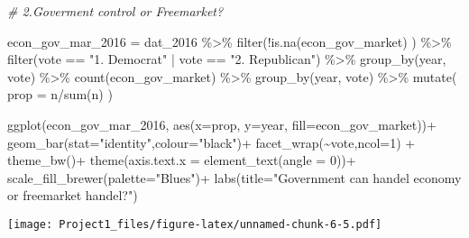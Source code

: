 \documentclass[
]{article}
\newenvironment{Shaded}{\begin{snugshade}}{\end{snugshade}}
\newcommand{\AttributeTok}[1]{\textcolor[rgb]{0.77,0.63,0.00}{#1}}
\newcommand{\CommentTok}[1]{\textcolor[rgb]{0.56,0.35,0.01}{\textit{#1}}}
\newcommand{\DecValTok}[1]{\textcolor[rgb]{0.00,0.00,0.81}{#1}}
\newcommand{\FunctionTok}[1]{\textcolor[rgb]{0.00,0.00,0.00}{#1}}
\newcommand{\NormalTok}[1]{#1}
\newcommand{\OtherTok}[1]{\textcolor[rgb]{0.56,0.35,0.01}{#1}}
\newcommand{\SpecialCharTok}[1]{\textcolor[rgb]{0.00,0.00,0.00}{#1}}
\newcommand{\StringTok}[1]{\textcolor[rgb]{0.31,0.60,0.02}{#1}}
\begin{document}
\begin{Shaded}
\begin{Highlighting}[]
\CommentTok{\# 2.Goverment control or Freemarket?}

\NormalTok{econ\_gov\_mar\_2016 }\OtherTok{=}\NormalTok{ dat\_2016 }\SpecialCharTok{\%\textgreater{}\%}
  \FunctionTok{filter}\NormalTok{(}\SpecialCharTok{!}\FunctionTok{is.na}\NormalTok{(econ\_gov\_market) ) }\SpecialCharTok{\%\textgreater{}\%}
  \FunctionTok{filter}\NormalTok{(vote }\SpecialCharTok{==} \StringTok{"1. Democrat"} \SpecialCharTok{|}\NormalTok{ vote }\SpecialCharTok{==} \StringTok{"2. Republican"}\NormalTok{) }\SpecialCharTok{\%\textgreater{}\%}
  \FunctionTok{group\_by}\NormalTok{(year, vote) }\SpecialCharTok{\%\textgreater{}\%}
  \FunctionTok{count}\NormalTok{(econ\_gov\_market) }\SpecialCharTok{\%\textgreater{}\%}
  \FunctionTok{group\_by}\NormalTok{(year, vote) }\SpecialCharTok{\%\textgreater{}\%}
  \FunctionTok{mutate}\NormalTok{(}
    \AttributeTok{prop =}\NormalTok{ n}\SpecialCharTok{/}\FunctionTok{sum}\NormalTok{(n)}
\NormalTok{  )}

\FunctionTok{ggplot}\NormalTok{(econ\_gov\_mar\_2016,}
       \FunctionTok{aes}\NormalTok{(}\AttributeTok{x=}\NormalTok{prop, }\AttributeTok{y=}\NormalTok{year, }\AttributeTok{fill=}\NormalTok{econ\_gov\_market))}\SpecialCharTok{+}
  \FunctionTok{geom\_bar}\NormalTok{(}\AttributeTok{stat=}\StringTok{"identity"}\NormalTok{,}\AttributeTok{colour=}\StringTok{"black"}\NormalTok{)}\SpecialCharTok{+}
  \FunctionTok{facet\_wrap}\NormalTok{(}\SpecialCharTok{\textasciitilde{}}\NormalTok{vote,}\AttributeTok{ncol=}\DecValTok{1}\NormalTok{) }\SpecialCharTok{+}
  \FunctionTok{theme\_bw}\NormalTok{()}\SpecialCharTok{+}
  \FunctionTok{theme}\NormalTok{(}\AttributeTok{axis.text.x =} \FunctionTok{element\_text}\NormalTok{(}\AttributeTok{angle =} \DecValTok{0}\NormalTok{))}\SpecialCharTok{+}
  \FunctionTok{scale\_fill\_brewer}\NormalTok{(}\AttributeTok{palette=}\StringTok{"Blues"}\NormalTok{)}\SpecialCharTok{+}
  \FunctionTok{labs}\NormalTok{(}\AttributeTok{title=}\StringTok{"Government can handel economy or freemarket handel?"}\NormalTok{)}
\end{Highlighting}
\end{Shaded}

\texttt{[image: Project1\_files/figure-latex/unnamed-chunk-6-5.pdf]}
\end{document}

